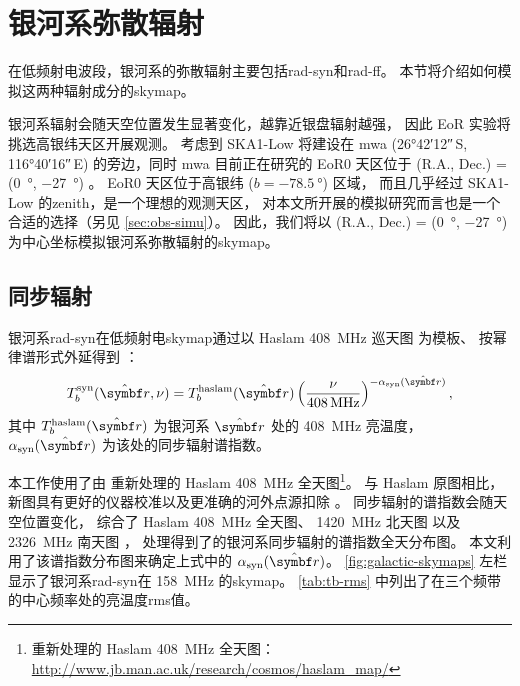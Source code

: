 \section{银河系弥散辐射}
\label{sec:simu-galactic}

在低频射电波段，银河系的弥散辐射主要包括\ac{rad-syn}和\ac{rad-ff}。
本节将介绍如何模拟这两种辐射成分的\ac{skymap}。

银河系辐射会随天空位置发生显著变化，越靠近银盘辐射越强，
因此 EoR 实验将挑选高银纬天区开展观测。
考虑到 SKA1-Low 将建设在 \ac{mwa} (\ang{26;42;12}\,S, \ang{116;40;16}\,E)
的旁边，同时 \ac{mwa} 目前正在研究的 EoR0 天区位于
(R.A., Dec.\@) = (\SI{0}{\degree}, \SI{-27}{\degree}) \cite{beardsley2016}。
EoR0 天区位于高银纬 ($b = \SI{-78.5}{\degree}$) 区域，
而且几乎经过 SKA1-Low 的\ac{zenith}，是一个理想的观测天区，
对本文所开展的模拟研究而言也是一个合适的选择（另见 \autoref{sec:obs-simu}）。
因此，我们将以 (R.A., Dec.\@) = (\SI{0}{\degree}, \SI{-27}{\degree})
为中心坐标模拟银河系弥散辐射的\ac{skymap}。

\subsection{同步辐射}

银河系\ac{rad-syn}在低频射电\ac{skymap}通过以
Haslam \SI{408}{\MHz} 巡天图\cite{haslam1982} 为模板、
按幂律谱形式外延得到 \cite{wang2010,bonaldi2015}：
\begin{equation}
  T_b^{\R{syn}}(\hat{\B{r}}, \nu)
    = T_b^{\R{haslam}}(\hat{\B{r}}) \left( \frac{\nu}{\SI{408}{\MHz}}
      \right)^{-\alpha_{\R{syn}}(\hat{\B{r}})} ,
\end{equation}
其中 $T_b^{\R{haslam}}(\hat{\B{r}})$ 为银河系 $\hat{\B{r}}$ 处的
\SI{408}{\MHz} 亮温度，
$\alpha_{\R{syn}}(\hat{\B{r}})$ 为该处的同步辐射谱指数。

本工作使用了由  重新处理的 Haslam \SI{408}{\MHz}
全天图\footnote{%
  重新处理的 Haslam \SI{408}{\MHz} 全天图：
  \url{http://www.jb.man.ac.uk/research/cosmos/haslam_map/}}。
与 Haslam 原图相比，新图具有更好的仪器校准以及更准确的河外点源扣除 \cite{remazeilles2015}。
同步辐射的谱指数会随天空位置变化，
 综合了 Haslam \SI{408}{\MHz} 全天图、
\SI{1420}{\MHz} 北天图 \cite{reich1986}
以及 \SI{2326}{\MHz} 南天图 \cite{jonas1998}，
处理得到了的银河系同步辐射的谱指数全天分布图。
本文利用了该谱指数分布图来确定上式中的 $\alpha_{\R{syn}}(\hat{\B{r}})$。
\autoref{fig:galactic-skymaps} 左栏显示了银河系\ac{rad-syn}在
\SI{158}{\MHz} 的\ac{skymap}。
\autoref{tab:tb-rms} 中列出了在三个频带的中心频率处的亮温度\ac{rms}值。

